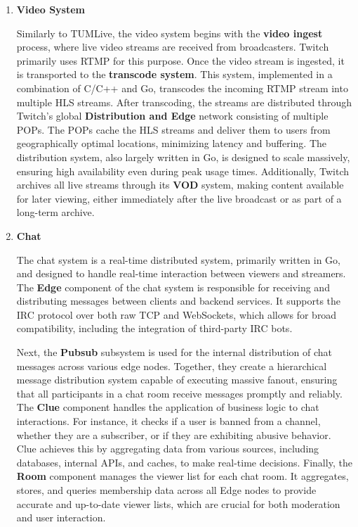 \begin{enumerate}
    \item \textbf{Video System}
    
    Similarly to TUMLive, the video system begins with the \textbf{video ingest} process, where live video streams are received from broadcasters. Twitch primarily uses \ac{RTMP} for this purpose. Once the video stream is ingested, it is transported to the \textbf{transcode system}. This system, implemented in a combination of C/C++ and Go, transcodes the incoming \ac{RTMP} stream into multiple \ac{HLS} streams.
    After transcoding, the streams are distributed through Twitch's global \textbf{Distribution and Edge} network consisting of multiple \ac{POPs}. The \ac{POPs} cache the \ac{HLS} streams and deliver them to users from geographically optimal locations, minimizing latency and buffering. The distribution system, also largely written in Go, is designed to scale massively, ensuring high availability even during peak usage times. Additionally, Twitch archives all live streams through its \textbf{\ac{VOD}} system, making content available for later viewing, either immediately after the live broadcast or as part of a long-term archive.
    
    \item \textbf{Chat}

    The chat system is a real-time distributed system, primarily written in Go, and designed to handle real-time interaction between viewers and streamers. The \textbf{Edge} component of the chat system is responsible for receiving and distributing messages between clients and backend services. It supports the \ac{IRC} protocol over both raw TCP and WebSockets, which allows for broad compatibility, including the integration of third-party \ac{IRC} bots.
    
    Next, the \textbf{Pubsub} subsystem is used for the internal distribution of chat messages across various edge nodes. Together, they create a hierarchical message distribution system capable of executing massive fanout, ensuring that all participants in a chat room receive messages promptly and reliably. The \textbf{Clue} component handles the application of business logic to chat interactions. For instance, it checks if a user is banned from a channel, whether they are a subscriber, or if they are exhibiting abusive behavior. Clue achieves this by aggregating data from various sources, including databases, internal \ac{API}s, and caches, to make real-time decisions. Finally, the \textbf{Room} component manages the viewer list for each chat room. It aggregates, stores, and queries membership data across all Edge nodes to provide accurate and up-to-date viewer lists, which are crucial for both moderation and user interaction.


\end{enumerate}

